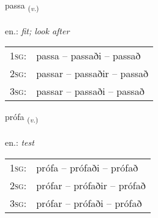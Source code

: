 \documentclass[frontgrid, backgrid]{flacards}\usepackage[]{graphicx}\usepackage[]{xcolor}
\begin{document}
\renewcommand{\flhead}{\vskip5pt \fboxsep=0pt {\small\bfseries\footnotesize Sagnorð | Verb}}
\renewcommand{\fcfoot}{\vskip5pt \fboxsep=0pt \hspace{2pt}{\small\bfseries\footnotesize 2K}}

\renewcommand{\blhead}{\vskip5pt {\small\bfseries\footnotesize Sagnorð | Verb }}
\renewcommand{\bcfoot}{\vskip5pt \hspace{2pt}{\small\bfseries\footnotesize 2K}}


{passa \small{\textsubscript{(\textit{v.})}} \\[1ex] %
\textphonetic{[pʰasa]} \\
en.: \emph{fit; look after} \\  [2ex]
\renewcommand*{\arraystretch}{0.8}
\begin{tabular}{p{1cm}l}
\textsc{1sg}: & passa -- passaði -- passað \\ 
\textsc{2sg}: & passar -- passaðir -- passað \\ 
\textsc{3sg}: & passar -- passaði -- passað \\ 
\end{tabular}
}

\renewcommand{\flhead}{\vskip5pt \fboxsep=0pt {\small\bfseries\footnotesize Sagnorð | Verb}}
\renewcommand{\fcfoot}{\vskip5pt \fboxsep=0pt \hspace{2pt}{\small\bfseries\footnotesize 2K}}

\renewcommand{\blhead}{\vskip5pt {\small\bfseries\footnotesize Sagnorð | Verb }}
\renewcommand{\bcfoot}{\vskip5pt \hspace{2pt}{\small\bfseries\footnotesize 2K}}


{prófa \small{\textsubscript{(\textit{v.})}} \\[1ex] %
\textphonetic{[pʰrouːva]} \\
en.: \emph{test} \\  [2ex]
\renewcommand*{\arraystretch}{0.8}
\begin{tabular}{p{1cm}l}
\textsc{1sg}: & prófa -- prófaði -- prófað \\ 
\textsc{2sg}: & prófar -- prófaðir -- prófað \\ 
\textsc{3sg}: & prófar -- prófaði -- prófað \\ 
\end{tabular}
}
\end{document}
